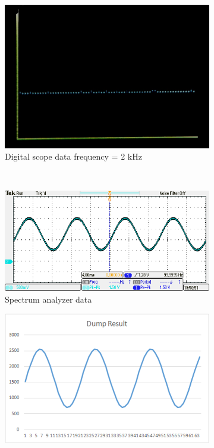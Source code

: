 \documentclass[a4paper]{article}
\newlength{\pic}
\begin{document}
\begin{figure}[htp]
\begin{subfigure}[H]{\pica}
	\includegraphics[width=\pica]{Images/2kHz}
	\caption{Digital scope data frequency = 2 kHz}
	\end{subfigure}	
	\\
	\begin{subfigure}[H]{\picb}
	\includegraphics[width=\picb]{oscilloscope/fir100}
	\caption{Spectrum analyzer data}
	\end{subfigure}
	\begin{subfigure}[H]{\picc}
	\includegraphics[width=\picc]{Plots/P3_100}

\end{subfigure}
\end{figure}
\end{document}
